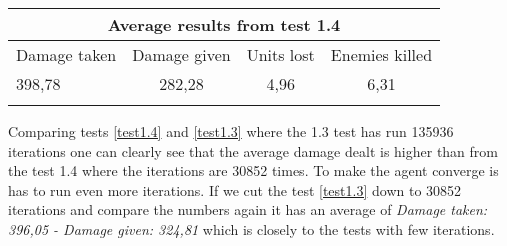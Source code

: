 \begin{centering}
 \begin{tabular}{|l||c|c|c|}
	\multicolumn{4}{c}{Average results from test 1.4} \\
	\hline
		Damage taken & Damage given & Units lost & Enemies killed\\
	\hline
		398,78 & 282,28 & 4,96 & 6,31 \\
	\hline
\label{test1.4}
\end{tabular}
\end{centering}


Comparing tests \ref{test1.4} and \ref{test1.3} where the 1.3 test has run 135936 iterations one can clearly see that the average damage dealt is higher than from the test 1.4 where the iterations are 30852 times. To make the agent converge is has to run even more iterations. If we cut the test \ref{test1.3} down to 30852 iterations and compare the numbers again it has an average of \textit{Damage taken: 396,05 - Damage given: 324,81} which is closely to the tests with few iterations.